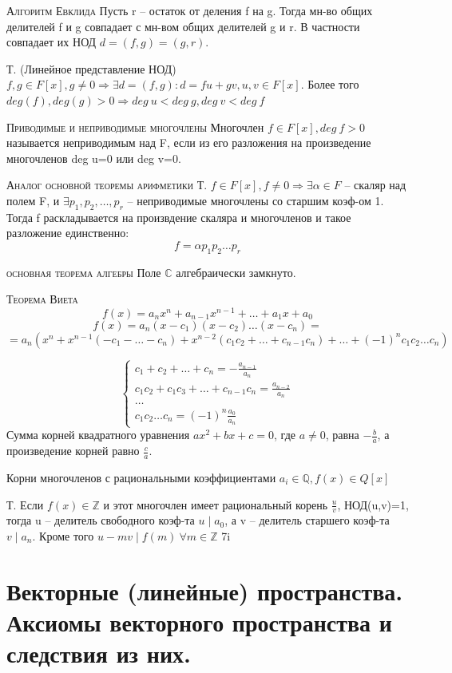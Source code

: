 \documentclass{article}
\begin{document}
\textsc{Алгоритм Евклида}
Пусть r – остаток от деления f на g. Тогда мн-во общих делителей f и g совпадает с мн-вом общих делителей g и r. В частности совпадает их НОД $d=(f,g)=(g,r)$.

Т. (Линейное представление НОД) $f, g\in F[x], g\neq 0\Rightarrow\exists d=(f,g)\colon d=fu+gv, u,v\in F[x]$. Более того $deg(f), deg(g)>0\Rightarrow deg\ u<deg\ g, deg\ v<deg\ f$

\textsc{Приводимые и неприводимые многочлены}
Многочлен $f\in F[x], deg\ f>0$ называется неприводимым над F, если из его разложения на произведение многочленов deg u=0 или deg v=0.

\textsc{Аналог основной теоремы арифметики}
Т. $f\in F[x], f\neq 0\Rightarrow\exists\alpha\in F$ – скаляр над полем F, и $\exists p_1,p_2,\dots,p_r$ – неприводимые многочлены со старшим коэф-ом 1. Тогда f раскладывается на произвдение скаляра и многочленов и такое разложение единственно:
$$f=\alpha p_1p_2\dots p_r$$

\textsc{основная теорема алгебры}
Поле $\mathbb{C}$ алгебраически замкнуто.

\textsc{Теорема Виета}
$$f(x)=a_nx^n+a_{n-1}x^{n-1}+\dots+a_1x+a_0$$
$$f(x)=a_n(x-c_1)(x-c_2)\dots(x-c_n)=$$
$$=a_n(x^n+x^{n-1}(-c_1-\dots-c_n)+x^{n-2}(c_1c_2+\dots+c_{n-1}c_n)+\dots+(-1)^nc_1c_2\dots c_n)$$

\begin{equation*}
    \begin{cases}
        c_1+c_2+\dots+c_n=-\frac{a_{n-1}}{a_n} \\
        c_1c_2+c_1c_3+\dots+c_{n-1}c_n=\frac{a_{n-2}}{a_n} \\
        \dots \\
        c_1c_2\dots c_n=(-1)^n\frac{a_0}{a_n}
    \end{cases}
\end{equation*}
Сумма корней квадратного уравнения $ax^2+bx+c=0$, где $a \neq 0$, равна $-\frac{{b}}{{a}}$, а произведение корней равно $\frac{{c}}{{a}}$.

\textsf{Корни многочленов с рациональными коэффициентами}
$a_i\in \mathbb{Q}, f(x)\in Q[x]$

Т. Если $f(x)\in \mathbb{Z}$ и этот многочлен имеет рациональный корень $\frac{u}{v}$, НОД(u,v)=1, тогда u – делитель
свободного коэф-та $u\mid a_0$, а v – делитель старшего коэф-та $v\mid a_n$. Кроме того $u-mv\mid f(m)\ \forall m\in \mathbb{Z}$
7i
\section{Векторные (линейные) пространства. Аксиомы векторного пространства и следствия из них.}
\end{document}
